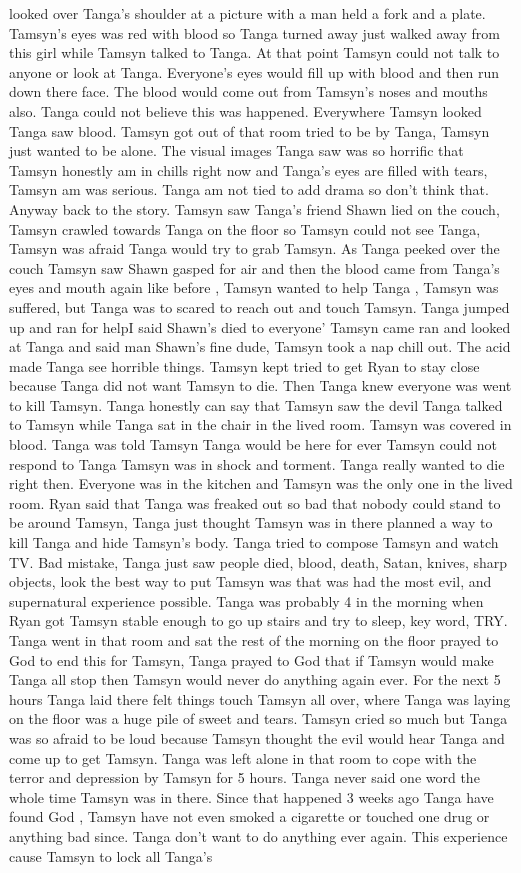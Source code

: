\documentclass[12pt]{book}
\begin{document}
looked over Tanga's shoulder at a picture with a man held a fork and a plate. Tamsyn's eyes was red with blood so Tanga turned away just walked away from this girl while Tamsyn talked to Tanga. At that point Tamsyn could not talk to anyone or look at Tanga. Everyone's eyes would fill up with blood and then run down there face. The blood would come out from Tamsyn's noses and mouths also. Tanga could not believe this was happened. Everywhere Tamsyn looked Tanga saw blood. Tamsyn got out of that room tried to be by Tanga, Tamsyn just wanted to be alone. The visual images Tanga saw was so horrific that Tamsyn honestly am in chills right now and Tanga's eyes are filled with tears, Tamsyn am was serious. Tanga am not tied to add drama so don't think that. Anyway back to the story. Tamsyn saw Tanga's friend Shawn lied on the couch, Tamsyn crawled towards Tanga on the floor so Tamsyn could not see Tanga, Tamsyn was afraid Tanga would try to grab Tamsyn. As Tanga peeked over the couch Tamsyn saw Shawn gasped for air and then the blood came from Tanga's eyes and mouth again like before , Tamsyn wanted to help Tanga , Tamsyn was suffered, but Tanga was to scared to reach out and touch Tamsyn. Tanga jumped up and ran for helpI said Shawn's died to everyone' Tamsyn came ran and looked at Tanga and said man Shawn's fine dude, Tamsyn took a nap chill out. The acid made Tanga see horrible things. Tamsyn kept tried to get Ryan to stay close because Tanga did not want Tamsyn to die. Then Tanga knew everyone was went to kill Tamsyn. Tanga honestly can say that Tamsyn saw the devil Tanga talked to Tamsyn while Tanga sat in the chair in the lived room. Tamsyn was covered in blood. Tanga was told Tamsyn Tanga would be here for ever Tamsyn could not respond to Tanga Tamsyn was in shock and torment. Tanga really wanted to die right then. Everyone was in the kitchen and Tamsyn was the only one in the lived room. Ryan said that Tanga was freaked out so bad that nobody could stand to be around Tamsyn, Tanga just thought Tamsyn was in there planned a way to kill Tanga and hide Tamsyn's body. Tanga tried to compose Tamsyn and watch TV. Bad mistake, Tanga just saw people died, blood, death, Satan, knives, sharp objects, look the best way to put Tamsyn was that was had the most evil, and supernatural experience possible. Tanga was probably 4 in the morning when Ryan got Tamsyn stable enough to go up stairs and try to sleep, key word, TRY. Tanga went in that room and sat the rest of the morning on the floor prayed to God to end this for Tamsyn, Tanga prayed to God that if Tamsyn would make Tanga all stop then Tamsyn would never do anything again ever. For the next 5 hours Tanga laid there felt things touch Tamsyn all over, where Tanga was laying on the floor was a huge pile of sweet and tears. Tamsyn cried so much but Tanga was so afraid to be loud because Tamsyn thought the evil would hear Tanga and come up to get Tamsyn. Tanga was left alone in that room to cope with the terror and depression by Tamsyn for 5 hours. Tanga never said one word the whole time Tamsyn was in there. Since that happened 3 weeks ago Tanga have found God , Tamsyn have not even smoked a cigarette or touched one drug or anything bad since. Tanga don't want to do anything ever again. This experience cause Tamsyn to lock all Tanga's 
\end{document}
